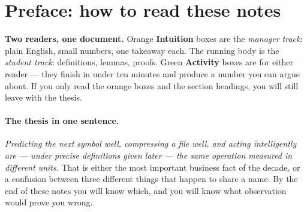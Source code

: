 %
%
%
%
%

\section*{Preface: how to read these notes}

\begin{howtoread}
\textbf{Two readers, one document.}
Orange \textbf{Intuition} boxes are the \emph{manager track}: plain
English, small numbers, one takeaway each. The running body is the
\emph{student track}: definitions, lemmas, proofs. Green
\textbf{Activity} boxes are for either reader --- they finish in under
ten minutes and produce a number you can argue about.
If you only read the orange boxes and the section headings, you will
still leave with the thesis.
\end{howtoread}

\paragraph{The thesis in one sentence.}
\emph{Predicting the next symbol well, compressing a file well, and
acting intelligently are --- under precise definitions given later ---
the same operation measured in different units.}
That is either the most important business fact of the decade, or a
confusion between three different things that happen to share a name.
By the end of these notes you will know which, and you will know what
observation would prove you wrong.

